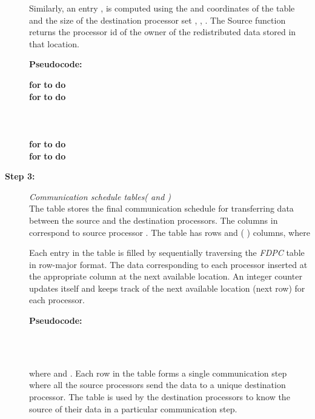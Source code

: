 \documentclass[letterpaper]{llncs}
\begin{document}
\begin{description}
Similarly, an entry ,   is computed using the  and  coordinates of the table and the size of the destination processor set , , . The Source function returns the processor id of the 
owner of the redistributed data stored in that location.

\textbf{Pseudocode:}
\begin{tabbing}
\hspace{0.4in}\textbf{for}  \textbf{to}  \textbf{do}\\
\hspace{0.7in}  \textbf{for}  \textbf{to}  \textbf{do} \\
\hspace{1in}       \\
\\
\\
\hspace{0.4in}\textbf{for}  \textbf{to}  \textbf{do} \\
\hspace{0.7in}   \textbf{for}  \textbf{to}  \textbf{do}\\
\hspace{1in}      
\end{tabbing}
\item[\textbf{Step 3:}] \hspace{0.05in}\textit{Communication schedule tables( and )}\\
The  table stores the final communication schedule for transferring data between 
the source and the destination processors. The columns in  correspond to source processor . 
The table has  rows and (  ) columns, where

\hspace{1.3in} 

Each entry in the  table is filled by sequentially traversing the \textit{FDPC} table in row-major format. 
The data corresponding to each processor  inserted at the appropriate column at the next available location. 
An integer counter updates itself and keeps track of the next available location (next row) for each processor.

\textbf{Pseudocode:}
\begin{tabbing}
\hspace{0.4in} \\
\hspace{0.4in} \\
\hspace{0.4in}
\end{tabbing}

where  and .
Each row in the  table forms a single communication step where all the source processors send the 
data to a unique destination processor. The  table is used by the destination processors to know the 
source of their data in a particular communication step.


\end{description}
\end{document}
